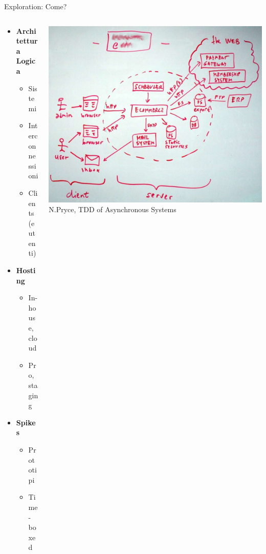 	\begin{frame}{Exploration: Come?}
		
		\begin{columns}[T]

		    \begin{column}{.5\textwidth}
				\begin{itemize}

					\item \textbf{Architettura Logica}
					\begin{itemize}
						\item Sistemi
						\item Interconnessioni
						\item Clients (e utenti)
					\end{itemize}
				
					\item \textbf{Hosting}
					\begin{itemize}
						\item In-house, cloud
						\item Pro, staging
					\end{itemize}
				
					\item \textbf{Spikes}
					\begin{itemize}
						\item Prototipi
						\item Time-boxed
					\end{itemize}
				\end{itemize}
			\end{column}
			
			\begin{column}{.5\textwidth}
				\hspace*{-0.6cm} \includegraphics[scale=0.15]{images/architecture-1} \\
				{\scriptsize N.Pryce, TDD of Asynchronous Systems}
			\end{column}
			

\end{columns}
\end{frame}
